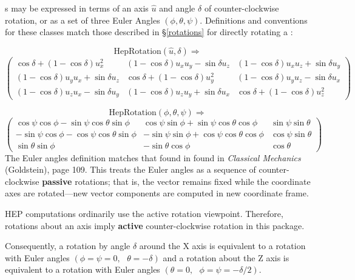 \Ro s may be expressed in terms of an axis $\hat{u}$
and angle $\delta$ of counter-clockwise
rotation, or as a set of three Euler Angles $(\phi, \theta, \psi)$.
Definitions and conventions for these classes
match those described in \S \ref{rotations}
for directly rotating a \SV:

\[  \mbox{HepRotation}(\hat{u},\delta) \Longrightarrow \]
\begin{equation}
\label{eq:axisrotR}
\left(
\begin{array}{ccc}
\cos \delta + (1 - \cos \delta ) u_x^2 &
(1 - \cos \delta ) u_x u_y - \sin \delta u_z &
(1 - \cos \delta ) u_x u_z + \sin \delta u_y \\
(1 - \cos \delta ) u_y u_x + \sin \delta u_z &
\cos \delta + (1 - \cos \delta ) u_y^2 &
(1 - \cos \delta ) u_y u_z - \sin \delta u_x \\
(1 - \cos \delta ) u_z u_x - \sin \delta u_y &
(1 - \cos \delta ) u_z u_y + \sin \delta u_x &
\cos \delta + (1 - \cos \delta ) u_z^2
\end{array}
\right)
\end{equation}

\[  \mbox{HepRotation}(\phi, \theta, \psi) \Longrightarrow  \]
\begin{equation}
\label{eq:eulerrotR}
\left(
\begin{array}{ccc}
\cos \psi \cos \phi - \sin \psi \cos \theta \sin \phi &
\cos \psi \sin \phi + \sin \psi \cos \theta \cos \phi &
\sin \psi \sin \theta \\
- \sin \psi \cos \phi - \cos \psi \cos \theta \sin \phi &
- \sin \psi \sin \phi + \cos \psi \cos \theta \cos \phi &
\cos \psi \sin \theta \\
\sin \theta \sin \phi &
- \sin \theta \cos \phi &
\cos \theta
\end{array}
\right)
\end{equation}
\noindent
The Euler angles definition matches that found in found in
{\em Classical Mechanics} (Goldstein), page 109.
This treats the Euler angles as a sequence of counter-clockwise {\bf passive}
rotations;
that is, the vector remains fixed while the coordinate axes are rotated---new
vector components are computed in new coordinate frame.

HEP computations ordinarily use the active rotation viewpoint.
Therefore, rotations about an axis imply {\bf active} counter-clockwise
rotation in this package. 

Consequently, a rotation by angle $\delta$ around the X axis is
equivalent to a rotation with Euler angles
$(\phi=\psi=0, \mbox{ } \theta = - \delta)$
and a rotation about the Z axis is
equivalent to a rotation with Euler angles
$(\theta = 0, \mbox{ } \phi=\psi= - \delta/2)$.

